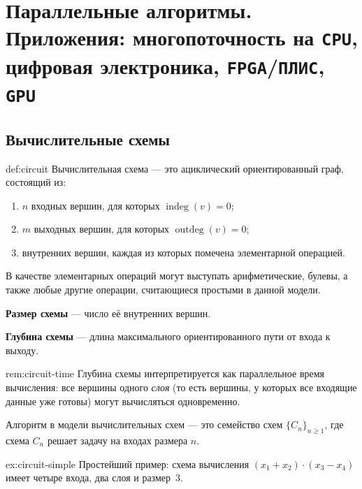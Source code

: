 
\section{Параллельные алгоритмы. Приложения: многопоточность на \texttt{CPU}, цифровая электроника, \texttt{FPGA}/\texttt{ПЛИС}, \texttt{GPU}}

\subsection{Вычислительные схемы}

\begin{Definition}{}{def:circuit}
	Вычислительная схема --- это ациклический ориентированный граф, состоящий из:
	\begin{enumerate}
		\item $n$ входных вершин, для которых $\operatorname{indeg}(v)=0$;
		\item $m$ выходных вершин, для которых $\operatorname{outdeg}(v)=0$;
		\item внутренних вершин, каждая из которых помечена элементарной операцией.
	\end{enumerate}
	В качестве элементарных операций могут выступать арифметические, булевы, а также любые другие операции, считающиеся простыми в данной модели.
	
	\medskip\noindent
	\textbf{Размер схемы} --- число её внутренних вершин.
	
	\medskip\noindent
	\textbf{Глубина схемы} --- длина максимального ориентированного пути от входа к выходу.
\end{Definition}

\begin{Remark}{}{rem:circuit-time}
	Глубина схемы интерпретируется как параллельное время вычисления: все вершины одного \emph{слоя} (то есть вершины, у которых все входящие данные уже готовы) могут вычисляться одновременно.
\end{Remark}

Алгоритм в модели вычислительных схем --- это семейство схем $\{C_n\}_{n\ge 1}$, где схема $C_n$ решает задачу на входах размера $n$.

\begin{Example}{}{ex:circuit-simple}
	Простейший пример: схема вычисления $(x_1+x_2)\cdot(x_3 - x_4)$ имеет четыре входа, два слоя и размер~$3$.
\end{Example}


